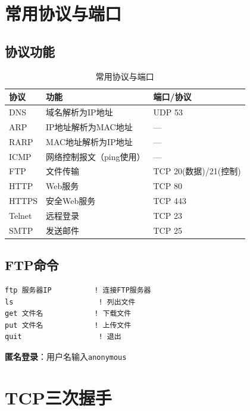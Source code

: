 \documentclass[12pt,a4paper]{ctexart}
\begin{document}
\section{常用协议与端口}

\subsection{协议功能}

\begin{table}[htbp]
\centering
\begin{tabular}{lll}
\toprule
\textbf{协议} & \textbf{功能} & \textbf{端口/协议} \\
\midrule
DNS & 域名解析为IP地址 & UDP 53 \\
ARP & IP地址解析为MAC地址 & — \\
RARP & MAC地址解析为IP地址 & — \\
ICMP & 网络控制报文（ping使用） & — \\
FTP & 文件传输 & TCP 20(数据)/21(控制) \\
HTTP & Web服务 & TCP 80 \\
HTTPS & 安全Web服务 & TCP 443 \\
Telnet & 远程登录 & TCP 23 \\
SMTP & 发送邮件 & TCP 25 \\
\bottomrule
\end{tabular}
\caption{常用协议与端口}
\end{table}

\subsection{FTP命令}

\begin{cmdbox}
\begin{lstlisting}
ftp 服务器IP          ! 连接FTP服务器
ls                    ! 列出文件
get 文件名            ! 下载文件
put 文件名            ! 上传文件
quit                  ! 退出
\end{lstlisting}

\textbf{匿名登录}：用户名输入\texttt{anonymous}
\end{cmdbox}

\section{TCP三次握手}
\end{document}
